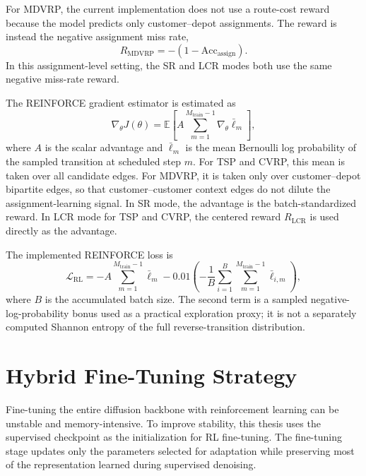 For MDVRP, the current implementation does not use a route-cost reward because the model predicts only customer--depot assignments. The reward is instead the negative assignment miss rate,
\[
    R_{\mathrm{MDVRP}}
    =
    -
    \left(
        1
        -
        \mathrm{Acc}_{\mathrm{assign}}
    \right).
\]
In this assignment-level setting, the SR and LCR modes both use the same negative miss-rate reward.

The REINFORCE gradient estimator \citep{williams1992simple} is estimated as
\[
    \nabla_\theta J(\theta)
    =
    \mathbb{E}
    \left[
        A
        \sum_{m=1}^{M_{\mathrm{train}}-1}
        \nabla_\theta
        \bar{\ell}_{m}
    \right],
\]
where \(A\) is the scalar advantage and \(\bar{\ell}_{m}\) is the mean Bernoulli log probability of the sampled transition at scheduled step \(m\). For TSP and CVRP, this mean is taken over all candidate edges. For MDVRP, it is taken only over customer--depot bipartite edges, so that customer--customer context edges do not dilute the assignment-learning signal. In SR mode, the advantage is the batch-standardized reward. In LCR mode for TSP and CVRP, the centered reward \(R_{\mathrm{LCR}}\) is used directly as the advantage.

The implemented REINFORCE loss is
\[
    \mathcal{L}_{\mathrm{RL}}
    =
    -
    A
    \sum_{m=1}^{M_{\mathrm{train}}-1}
    \bar{\ell}_{m}
    -
    0.01
    \left(
        -
        \frac{1}{B}
        \sum_{i=1}^{B}
        \sum_{m=1}^{M_{\mathrm{train}}-1}
        \bar{\ell}_{i,m}
    \right),
\]
where \(B\) is the accumulated batch size. The second term is a sampled negative-log-probability bonus used as a practical exploration proxy; it is not a separately computed Shannon entropy of the full reverse-transition distribution.

\section{Hybrid Fine-Tuning Strategy}
\label{sec:hybrid-finetuning-strategy}

Fine-tuning the entire diffusion backbone with reinforcement learning can be unstable and memory-intensive. To improve stability, this thesis uses the supervised checkpoint as the initialization for RL fine-tuning. The fine-tuning stage updates only the parameters selected for adaptation while preserving most of the representation learned during supervised denoising.

